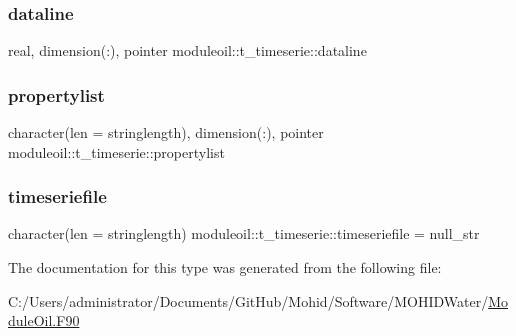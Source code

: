 \subsubsection{\texorpdfstring{dataline}{dataline}}
{\footnotesize\ttfamily real, dimension(\+:), pointer moduleoil\+::t\+\_\+timeserie\+::dataline\hspace{0.3cm}{\ttfamily [private]}}

\mbox{\label{structmoduleoil_1_1t__timeserie_a87e0468439878dc36a1d2ae4329b996a}} 
\subsubsection{\texorpdfstring{propertylist}{propertylist}}
{\footnotesize\ttfamily character(len = stringlength), dimension(\+:), pointer moduleoil\+::t\+\_\+timeserie\+::propertylist\hspace{0.3cm}{\ttfamily [private]}}

\mbox{\label{structmoduleoil_1_1t__timeserie_a980716d2f12644150d2b4404d25efe8e}} 
\subsubsection{\texorpdfstring{timeseriefile}{timeseriefile}}
{\footnotesize\ttfamily character(len = stringlength) moduleoil\+::t\+\_\+timeserie\+::timeseriefile = null\+\_\+str\hspace{0.3cm}{\ttfamily [private]}}



The documentation for this type was generated from the following file\+:\begin{DoxyCompactItemize}
\item 
C\+:/\+Users/administrator/\+Documents/\+Git\+Hub/\+Mohid/\+Software/\+M\+O\+H\+I\+D\+Water/\mbox{\hyperlink{_module_oil_8_f90}{Module\+Oil.\+F90}}\end{DoxyCompactItemize}
